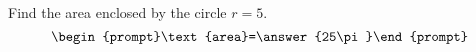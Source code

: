 \documentclass{ximera}
\author{Gregory Hartman \and Matthew Carr}
\begin{document}
\begin{exercise}





Find the area enclosed by the circle $r=5$.
\[
\begin{prompt}\text{area}=\answer{25\pi}\end{prompt}
\]

\end{exercise}
\end{document}
